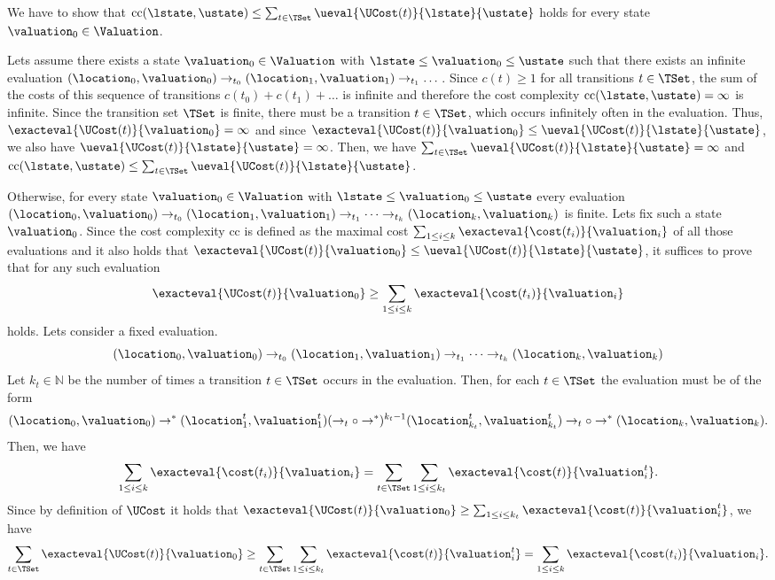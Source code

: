 We have to show that $\text{cc}(\lstate, \ustate) \leq \sum_{t \in \TSet} \ueval{\UCost(t)}{\lstate}{\ustate}$ holds for every state $\valuation_0 \in \Valuation$.

Lets assume there exists a state $\valuation_0 \in \Valuation$ with $\lstate \leq \valuation_0 \leq \ustate$ such that there exists an infinite evaluation $(\location_0, \valuation_0) \rightarrow_{t_0} (\location_1, \valuation_1) \rightarrow_{t_1} \dots$.
Since $c(t) \geq 1$ for all transitions $t \in \TSet$, the sum of the costs of this sequence of transitions $c(t_0) + c(t_1) + \dots$ is infinite and therefore the cost complexity $\text{cc}(\lstate, \ustate) = \infty$ is infinite.
Since the transition set $\TSet$ is finite, there must be a transition $t \in \TSet$, which occurs infinitely often in the evaluation.
Thus, $\exacteval{\UCost(t)}{\valuation_0} = \infty$ and since $\exacteval{\UCost(t)}{\valuation_0} \leq \ueval{\UCost(t)}{\lstate}{\ustate}$, we also have $\ueval{\UCost(t)}{\lstate}{\ustate} = \infty$.
Then, we have $\sum_{t \in \TSet} \ueval{\UCost(t)}{\lstate}{\ustate} = \infty$ and $\text{cc}(\lstate, \ustate) \leq \sum_{t \in \TSet} \ueval{\UCost(t)}{\lstate}{\ustate}$.

Otherwise, for every state $\valuation_0 \in \Valuation$ with $\lstate \leq \valuation_0 \leq \ustate$ every evaluation $(\location_0, \valuation_0) \rightarrow_{t_0} (\location_1, \valuation_1) \rightarrow_{t_1} \dots \rightarrow_{t_k} (\location_k, \valuation_k)$ is finite.
Lets fix such a state $\valuation_0$.
Since the cost complexity $\text{cc}$ is defined as the maximal cost $\sum_{1 \leq i \leq k} \exacteval{\cost(t_i)}{\valuation_i}$ of all those evaluations and it also holds that $\exacteval{\UCost(t)}{\valuation_0} \leq \ueval{\UCost(t)}{\lstate}{\ustate}$, it suffices to prove that for any such evaluation \[ \exacteval{\UCost(t)}{\valuation_0} \geq \sum_{1 \leq i \leq k} \exacteval{\cost(t_i)}{\valuation_i} \] holds.
Lets consider a fixed evaluation.
\[ (\location_0, \valuation_0) \rightarrow_{t_0} (\location_1, \valuation_1) \rightarrow_{t_1} \dots \rightarrow_{t_k} (\location_k, \valuation_k) \]
Let $k_t \in \mathbb{N}$ be the number of times a transition $t \in \TSet$ occurs in the evaluation.
Then, for each $t \in \TSet$ the evaluation must be of the form
\[ (\location_0, \valuation_0) \rightarrow^* (\location^t_1, \valuation^t_1) (\rightarrow_t \circ \rightarrow^*)^{k_t-1} (\location^t_{k_t}, \valuation^t_{k_t}) \rightarrow_t \circ \rightarrow^* (\location_k, \valuation_k). \]
Then, we have \[ \sum_{1 \leq i \leq k} \exacteval{\cost(t_i)}{\valuation_i} = \sum_{t \in \TSet} \sum_{1 \leq i \leq k_t} \exacteval{\cost(t)}{\valuation^t_i}. \]
Since by definition of $\UCost$ it holds that $\exacteval{\UCost(t)}{\valuation_0} \geq \sum_{1 \leq i \leq k_t} \exacteval{\cost(t)}{\valuation^t_i}$, we have \[ \sum_{t \in \TSet} \exacteval{\UCost(t)}{\valuation_0} \geq \sum_{t \in \TSet} \sum_{1 \leq i \leq k_t} \exacteval{\cost(t)}{\valuation^t_i} = \sum_{1 \leq i \leq k} \exacteval{\cost(t_i)}{\valuation_i}. \]


